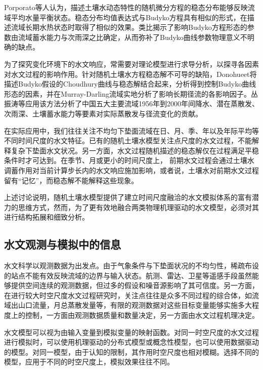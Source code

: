 Porporato等人\cite{porporato2004soil}认为，描述土壤水动态特性的随机微分方程的稳态分布能够反映流域平均水量平衡状态。稳态分布均值表达式与Budyko方程具有相似的形式，在描述流域长期水热状态时取得了相似的效果。类比揭示了影响Budyko方程形态的参数由流域蓄水能力与次雨深之比确定，从而弥补了Budyko曲线参数物理意义不明确的缺点。

为了探究变化环境下的水文响应，常需要对理论模型进行求导分析，以探寻各因素对水文过程的影响作用\cite{todini2007hydrological}。针对随机土壤水方程稳态解不可导的缺陷，Donohueet\cite{donohue2012roots}将描述Budyko假设的Choudhury曲线\cite{choudhury1999evaluation}与稳态解结合起来，分析得到控制Budyko曲线形态的因素，并在Murray-Darling流域实地分析了影响长期径流的各影响因子。丛振涛等\cite{cong2015understanding}应用该方法分析了中国五大主要流域1956年到2000年间降水、潜在蒸散发、次雨深、土壤蓄水能力等要素对实际蒸散发与径流变化的贡献。


在实际应用中，我们往往关注不均匀下垫面流域在日、月、季、年以及年际平均等不同时间尺度的水文特征。已有的随机土壤水模型关注点尺度的水文过程，不能解释复杂下垫面水文状况。另一方面，水文过程随机描述的稳态解仅在过程满足平稳条件时才可达到。在季节、月或更小的时间尺度上， 前期水文过程会通过土壤水调蓄作用对当前计算步长内的水文响应施加影响，或者说，土壤水对前期水文过程留有``记忆''，而稳态解不能解释这些现象。


上述讨论说明，随机土壤水模型提供了建立时间尺度融洽的水文模拟体系的富有潜力的思维方式，然而，为了更有效地融合两类物理机理驱动的水文模型，必须对其进行结构拓展和细致分析。
 



\subsection{水文观测与模拟中的信息} 
水文科学以观测数据为出发点。由于气象条件与下垫面状况的不均匀性，稀疏布设的站点不能有效反映流域的边界与输入状态。航测、雷达、卫星等遥感手段虽然能够提供空间连续的观测数据，但过多的假设和噪音源影响了其可信度。另一方面，在进行较大时空尺度水文过程研究时，关注点往往是众多不同过程的综合体，如流域出山口流量，月总蒸散发量等，有限的观测数据对这些目标变量能够实施多大程度上的控制，一方面由观测数据质量和数量决定，另一方面由水文过程机理决定。

水文模型可以视为由输入变量到模拟变量的映射函数。对同一时空尺度的水文过程进行模拟时，可以使用机理驱动的分布式模型或概念性模型，也可以使用数据驱动的模型。对同一模型，由于认知的限制，其作用时空尺度也相对模糊。选择不同的模型，应用于不同的时空尺度上，模拟效果往往不同。

